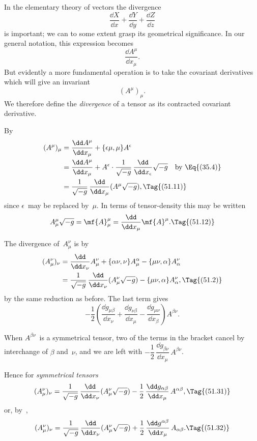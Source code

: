 \documentclass[12pt]{book}
\begin{document}
%
%

In the elementary theory of vectors the divergence
\[
\frac{\dd X}{\dd x} + \frac{\dd Y}{\dd y} + \frac{\dd Z}{\dd z}
\]
is important; we can to some extent grasp its geometrical significance. In
our general notation, this expression becomes
\[
\frac{\dd A^{\mu}}{\dd x_{\mu}}.
\]
But evidently a more fundamental operation is to take the covariant derivatives
which will give an invariant
\[
(A^{\mu})_{\mu}.
\]
We therefore define the \emph{divergence} of a tensor as its contracted covariant
derivative.

By 
\begin{align*}
  (A^{\mu})_{\mu}
  &= \frac{\dd A^{\mu}}{\dd x_{\mu}} + \{\epsilon\mu, \mu\} A^{\epsilon} \\
  &= \frac{\dd A^{\mu}}{\dd x_{\mu}}
  + A^{\epsilon} \cdot \frac{1}{\sqrt{-g}}\, \frac{\dd}{\dd x_{\epsilon}} \sqrt{-g}
  \quad\text{by~\Eq{(35.4)}} \\
  &= \frac{1}{\sqrt{-g}}\, \frac{\dd}{\dd x_{\mu}} (A^{\mu} \sqrt{-g}),
  \Tag{(51.11)}
\end{align*}
since $\epsilon$~may be replaced by~$\mu$. In terms of tensor\hyp{}density this may be written
\[
A_{\mu}^{\mu} \sqrt{-g}
= \mf{A}_{\mu}^{\mu}
= \frac{\dd}{\dd x_{\mu}} \mf{A}^{\mu}.
\Tag{(51.12)}
\]

The divergence of~$A_{\mu}^{\nu}$ is by~
\begin{align*}
  (A_{\mu}^{\nu})_{\nu}
  &= \frac{\dd}{\dd x_{\nu}} A_{\mu}^{\nu} + \{\alpha\nu,\nu\} A_{\mu}^{\alpha} - \{\mu\nu, \alpha\} A_{\alpha}^{\nu} \\
  &= \frac{1}{\sqrt{-g}}\, \frac{\dd}{\dd x_{\nu}} (A_{\mu}^{\nu} \sqrt{-g}) - \{\mu\nu, \alpha\} A_{\alpha}^{\nu},
  \Tag{(51.2)}
\end{align*}
by the same reduction as before. The last term gives
\[
-\frac{1}{2} \left(\frac{\dd g_{\mu\beta}}{\dd x_{\nu}}
+ \frac{\dd g_{\nu\beta}}{\dd x_{\mu}}
- \frac{\dd g_{\mu\nu}}{\dd x_{\beta}}\right) A^{\beta\nu}.
\]

When $A^{\beta\nu}$~is a symmetrical tensor, two of the terms in the bracket cancel
by interchange of $\beta$ and~$\nu$, and we are left with $-\dfrac{1}{2}\, \dfrac{\dd g_{\beta\nu}}{\dd x_{\mu}}\, A^{\beta\nu}$.

Hence for \emph{symmetrical tensors}
\[
(A_{\mu}^{\nu})_{\nu}
= \frac{1}{\sqrt{-g}}\, \frac{\dd}{\dd x_{\nu}} (A_{\mu}^{\nu} \sqrt{-g})
- \frac{1}{2}\, \frac{\dd g_{\alpha\beta}}{\dd x_{\mu}}\, A^{\alpha\beta},
\Tag{(51.31)}
\]
or, by~,
\[
(A_{\mu}^{\nu})_{\nu}
= \frac{1}{\sqrt{-g}}\, \frac{\dd}{\dd x_{\nu}} (A_{\mu}^{\nu} \sqrt{-g})
+ \frac{1}{2}\, \frac{\dd g^{\alpha\beta}}{\dd x_{\mu}}\, A_{\alpha\beta}.
\Tag{(51.32)}
\]
\end{document}
